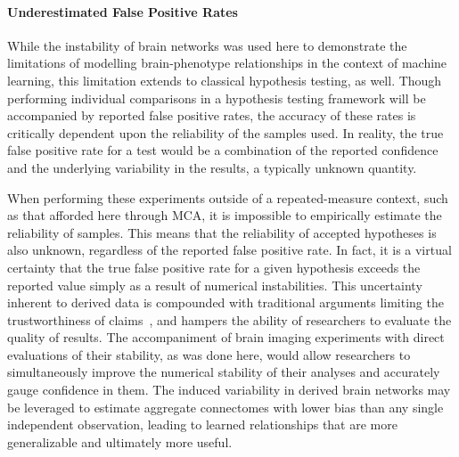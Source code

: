 \documentclass[fleqn,10pt]{SelfArx} %
\begin{document}
\paragraph{Underestimated False Positive Rates}
While the instability of brain networks was used here to demonstrate the limitations of modelling brain-phenotype
relationships in the context of machine learning, this limitation extends to classical hypothesis testing, as well.
Though performing individual comparisons in a hypothesis testing framework will be accompanied by reported false
positive rates, the accuracy of these rates is critically dependent upon the reliability of the samples used. In
reality, the true false positive rate for a test would be a combination of the reported confidence and the underlying
variability in the results, a typically unknown quantity.

When performing these experiments outside of a repeated-measure context, such as that afforded here through MCA, it is
impossible to empirically estimate the reliability of samples. This means that the reliability of accepted hypotheses
is also unknown, regardless of the reported false positive rate. In fact, it is a virtual certainty that the true false
positive rate for a given hypothesis exceeds the reported value simply as a result of numerical instabilities. This
uncertainty inherent to derived data is compounded with traditional arguments limiting the trustworthiness of
claims~\cite{ioannidis2005most}, and hampers the ability of researchers to evaluate the quality of results. The
accompaniment of brain imaging experiments with direct evaluations of their stability, as was done here, would allow
researchers to simultaneously improve the numerical stability of their analyses and accurately gauge confidence in
them. The induced variability in derived brain networks may be leveraged to estimate aggregate connectomes with lower
bias than any single independent observation, leading to learned relationships that are more generalizable and
ultimately more useful.
\end{document}
